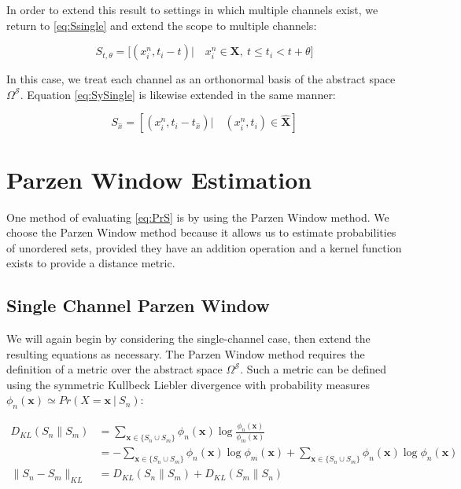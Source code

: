 \documentclass[10pt]{article}
\begin{document}
In order to extend this result to settings in which multiple channels exist, we return to \ref{eq:Ssingle} and extend the scope to multiple channels:

\begin{equation} \label{eq:Smultiple} S_{t,\theta} = \big[ \left( x_i^n,t_i - t \right) | \quad x_i^n \in \mathbf{X}, \ t \le t_i < t+\theta \big] \end{equation}

In this case, we treat each channel as an orthonormal basis of the abstract space \( \Omega^\mathcal{S} \).  Equation \ref{eq:SySingle} is likewise extended in the same manner:

\begin{equation} \label{eq:SyMultiple} 
S_{\hat{x}} =  \left[ \left( x_i^n,t_i - t_{\hat{x}} \right) | \quad (x_i^n,t_i) \in \mathbf{\hat{X}} \right] 
\end{equation}


\section{ Parzen Window Estimation}

One method of evaluating \ref{eq:PrS} is by using the Parzen Window method.  We choose the Parzen Window method because it allows us to estimate probabilities of unordered sets, provided they have an addition operation and a kernel function exists to provide a distance metric.  

\subsection{ Single Channel Parzen Window}

We will again begin by considering the single-channel case, then extend the resulting equations as necessary.  The Parzen Window method requires the definition of a metric over the abstract space \( \Omega^\mathcal{S} \).  Such a metric can be defined using the symmetric Kullbeck Liebler divergence with probability measures \( \phi_n(\mathbf{x}) \simeq Pr(X = \mathbf{x} \ | \ S_n) \):

\begin{align} \label{eq:KLsingle}
D_{KL}(S_n\|S_m) &= \sum_{\mathbf{x} \in \{ S_n \cup S_m \} } \phi_n( \mathbf{x} ) \log \frac{ \phi_n(\mathbf{x}) }{ \phi_m( \mathbf{x} ) } \nonumber \\
&= -\sum_{\mathbf{x} \in \{ S_n \cup S_m \} } \phi_n(\mathbf{x}) \log \phi_m(\mathbf{x}) + \sum_{\mathbf{x} \in \{ S_n \cup S_m \} } \phi_n(\mathbf{x}) \log \phi_n(\mathbf{x}) \\
\|S_n - S_m\|_{KL} &= D_{KL}(S_n\|S_m) + D_{KL}(S_m\|S_n)
\end{align}
\end{document}
